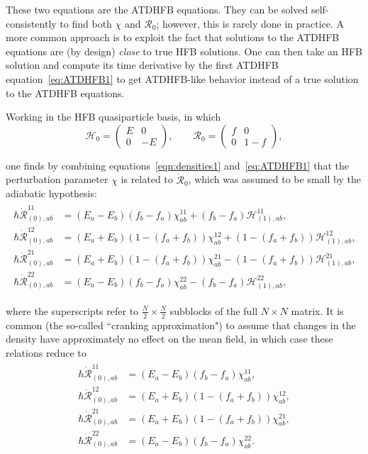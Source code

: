 \noindent These two equations are the ATDHFB equations. They can be solved self-consistently to find both $\chi$ and $\mathcal{R}_0$; however, this is rarely done in practice. A more common approach is to exploit the fact that solutions to the ATDHFB equations are (by design) \textit{close} to true HFB solutions. One can then take an HFB solution and compute its time derivative by the first ATDHFB equation~\eqref{eq:ATDHFB1} to get ATDHFB-like behavior instead of a true solution to the ATDHFB equations.

Working in the HFB quasiparticle basis, in which
\begin{equation}
\mathcal{H}_0 =
\left(\begin{array}{cc}
E & 0 \\
0 & -E
\end{array}\right),
\qquad
\mathcal{R}_0 =
\left(\begin{array}{cc}
f & 0 \\
0 & 1-f
\end{array}\right),
\end{equation}

\noindent one finds by combining equations~\eqref{eqn:densities1} and~\eqref{eq:ATDHFB1} that the perturbation parameter $\chi$ is related to $\mathcal{\dot{R}}_0$, which was assumed to be small by the adiabatic hypothesis:
\begin{align}\label{eqn:chi-rdot_uncranked}
\begin{aligned}
\hbar \dot{\mathcal{R}}_{(0),ab}^{11} &= (E_a-E_b)(f_b-f_a)\chi_{ab}^{11} + (f_b-f_a)\mathcal{H}^{11}_{(1),ab}, \\
\hbar \dot{\mathcal{R}}_{(0),ab}^{12} &= (E_a+E_b)\left(1-(f_a+f_b)\right)\chi_{ab}^{12} + \left(1-(f_a+f_b)\right)\mathcal{H}^{12}_{(1),ab}, \\
\hbar \dot{\mathcal{R}}_{(0),ab}^{21} &= (E_a+E_b)\left(1-(f_a+f_b)\right)\chi_{ab}^{21} - \left(1-(f_a+f_b)\right)\mathcal{H}^{21}_{(1),ab}, \\
\hbar \dot{\mathcal{R}}_{(0),ab}^{22} &= (E_a-E_b)(f_b-f_a)\chi_{ab}^{22} - (f_b-f_a)\mathcal{H}^{22}_{(1),ab},
\end{aligned}
\end{align}

\noindent where the superscripts refer to $\frac{N}{2}\times\frac{N}{2}$ subblocks of the full $N\times N$ matrix. It is common (the so-called ``cranking approximation") to assume that changes in the density have approximately no effect on the mean field, in which case these relations reduce to
\begin{align}\label{eqn:chi-rdot}
\begin{aligned}
\hbar \dot{\mathcal{R}}_{(0),ab}^{11} &= (E_a-E_b)(f_b-f_a)\chi_{ab}^{11}, \\
\hbar \dot{\mathcal{R}}_{(0),ab}^{12} &= (E_a+E_b)\left(1-(f_a+f_b)\right)\chi_{ab}^{12}, \\
\hbar \dot{\mathcal{R}}_{(0),ab}^{21} &= (E_a+E_b)\left(1-(f_a+f_b)\right)\chi_{ab}^{21}, \\
\hbar \dot{\mathcal{R}}_{(0),ab}^{22} &= (E_a-E_b)(f_b-f_a)\chi_{ab}^{22}.
\end{aligned}
\end{align}

